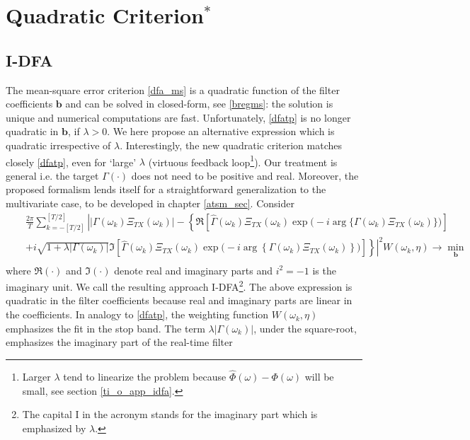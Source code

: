 \documentclass[a4paper]{book}
\begin{document}
\section{Quadratic Criterion$^*$}\label{idfas}

\subsection{I-DFA}


The mean-square error criterion \ref{dfa_ms} is a quadratic function of the filter coefficients $\mathbf{b}$ and can be solved  in closed-form, see \ref{bregms}: the solution is unique and numerical computations are fast. Unfortunately, \ref{dfatp} is no longer quadratic in $\mathbf{b}$, if $\lambda>0$. We here propose an alternative expression which is quadratic irrespective of $\lambda$. Interestingly, the new quadratic criterion matches closely \ref{dfatp}, even for `large' $\lambda$ (virtuous feedback loop\footnote{Larger $\lambda$ tend to linearize the problem because $\hat{\Phi}(\omega)-\Phi(\omega)$ will be small, see section \ref{ti_o_app_idfa}.}). Our treatment is general i.e. the target $\Gamma(\cdot)$ does not need to be positive and real. Moreover, the proposed formalism lends itself for a straightforward generalization to the multivariate case, to be developed in chapter \ref{atsm_sec}. Consider
\begin{eqnarray}\label{idfa}
&&\frac{2\pi}{T} \sum_{k=-[T/2]}^{[T/2]}
 \left|\big|\Gamma(\omega_k)\Xi_{TX}(\omega_k)\big|-\left\{\Re\left[\hat{\Gamma}(\omega_k)\Xi_{TX}(\omega_k)\exp\big(-i\arg\big\{\Gamma(\omega_k)\Xi_{TX}(\omega_k)\big\}\big)\right]\right.\right.\nonumber\\
 &&\left.\left.+i\sqrt{1+\lambda|\Gamma(\omega_k)|}
 \Im\left[\hat{\Gamma}(\omega_k)\Xi_{TX}(\omega_k)\exp\big(-i\arg\left\{\Gamma(\omega_k)\Xi_{TX}(\omega_k)\right\}\big)\right]\right\}\right|^2 W(\omega_k,\eta)\to\min_{\mathbf{b}}\nonumber\\
\end{eqnarray}
where $\Re(\cdot)$ and $\Im(\cdot)$ denote real and imaginary parts and $i^2=-1$ is the imaginary unit.
We call the resulting approach I-DFA\footnote{The capital I in the acronym stands for the imaginary part which
is emphasized by $\lambda$.}. The above expression is quadratic in the filter coefficients because real and imaginary parts are linear in the coefficients. In analogy to \ref{dfatp}, the weighting function $W(\omega_k,\eta)$ emphasizes the fit  in the
stop band. The term $\lambda|\Gamma(\omega_k)|$, under the square-root, emphasizes the imaginary part of the real-time filter
\end{document}
